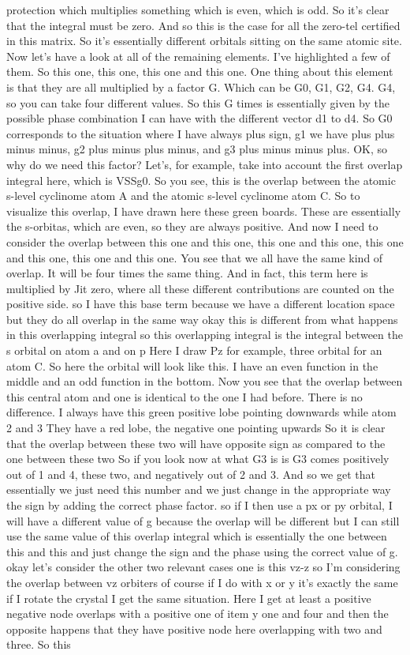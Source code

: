 protection which multiplies something which is even, which is odd. So it's clear that the integral must be zero. And so this is the case for all the zero-tel certified in this matrix. So it's essentially different orbitals sitting on the same atomic site. Now let's have a look at all of the remaining elements. I've highlighted a few of them. So this one, this one, this one and this one. One thing about this element is that they are all multiplied by a factor G. Which can be G0, G1, G2, G4. G4, so you can take four different values. So this G times is essentially given by the possible phase combination I can have with the different vector d1 to d4. So G0 corresponds to the situation where I have always plus sign, g1 we have plus plus minus minus, g2 plus minus plus minus, and g3 plus minus minus plus. OK, so why do we need this factor? Let's, for example, take into account the first overlap integral here, which is VSSg0. So you see, this is the overlap between the atomic s-level cyclinome atom A and the atomic s-level cyclinome atom C. So to visualize this overlap, I have drawn here these green boards. These are essentially the s-orbitas, which are even, so they are always positive. And now I need to consider the overlap between this one and this one, this one and this one, this one and this one, this one and this one. You see that we all have the same kind of overlap. It will be four times the same thing. And in fact, this term here is multiplied by Jit zero, where all these different contributions are counted on the positive side. so I have this base term because we have a different location space but they do all overlap in the same way okay this is different from what happens in this overlapping integral so this overlapping integral is the integral between the s orbital on atom a and on p Here I draw Pz for example, three orbital for an atom C. So here the orbital will look like this. I have an even function in the middle and an odd function in the bottom. Now you see that the overlap between this central atom and one is identical to the one I had before. There is no difference. I always have this green positive lobe pointing downwards while atom 2 and 3 They have a red lobe, the negative one pointing upwards So it is clear that the overlap between these two will have opposite sign as compared to the one between these two So if you look now at what G3 is is G3 comes positively out of 1 and 4, these two, and negatively out of 2 and 3. And so we get that essentially we just need this number and we just change in the appropriate way the sign by adding the correct phase factor. so if I then use a px or py orbital, I will have a different value of g because the overlap will be different but I can still use the same value of this overlap integral which is essentially the one between this and this and just change the sign and the phase using the correct value of g. okay let's consider the other two relevant cases one is this vz-z so I'm considering the overlap between vz orbiters of course if I do with x or y it's exactly the same if I rotate the crystal I get the same situation. Here I get at least a positive negative node overlaps with a positive one of item y one and four and then the opposite happens that they have positive node here overlapping with two and three. So this 